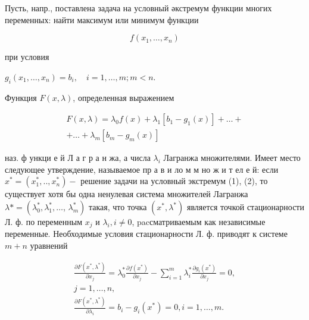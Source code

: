 \documentclass[10pt]{article}
\begin{document}
Пусть, напр., поставлена задача на условный әкстремум функции многих переменных: найти максимум или минимум функции



\[

f\left(x_{1}, \ldots, x_{n}\right)

\]



при условия



$g_{i}\left(x_{1}, \ldots, x_{n}\right)=b_{i}, \quad i=1, \ldots, m ; m<n$.



Функция $F(x, \lambda)$, определенная выражением



\[

\begin{gathered}

F(x, \lambda)=\lambda_{0} f(x)+\lambda_{1}\left[b_{1}-g_{1}(x)\right]+\ldots+ \\

+\ldots+\lambda_{m}\left[b_{m}-g_{m}(x)\right]

\end{gathered}

\]



наз. ф ункци е й Л а г р а н жа, а числа $\lambda_{i}$ Лагранжа множителями. Имеет место следующее утверждение, называемое пр а в и ло м м но ж и т ел е й: если $x^{*}=\left(x_{1}^{*}, . ., x_{n}^{*}\right)-$ решение задачи на условный экстремум (1), (2), то существует хотя бы одна ненулевая система множителей Лагранжа $\lambda *=\left(\lambda_{0}^{*}, \lambda_{1}^{*}, \ldots\right.$, $\left.\lambda_{m}^{*}\right)$ такая, что точка $\left(x^{*}, \lambda^{*}\right)$ является точкой стационарности Л. ф. по переменным $x_{j}$ и $\lambda_{i}, i \neq 0$, pacсматриваемым как независимые переменные. Необходимые условия стационарности Л. ф. приводят к системе $m+n$ уравнений



\[

\begin{gathered}

\frac{\partial F\left(x^{*}, \lambda^{*}\right)}{\partial x_{j}}=\lambda_{0}^{*} \frac{\partial f\left(x^{*}\right)}{\partial x_{j}}-\sum_{i=1}^{m} \lambda_{i}^{*} \frac{\partial g_{i}\left(x^{*}\right)}{\partial x_{j}}=0, \\

j=1, \ldots, n, \\

\frac{\partial F\left(x^{*}, \lambda^{*}\right)}{\partial \lambda_{i}}=b_{i}-g_{i}\left(x^{*}\right)=0, i=1, \ldots, m .

\end{gathered}

\]
\end{document}
